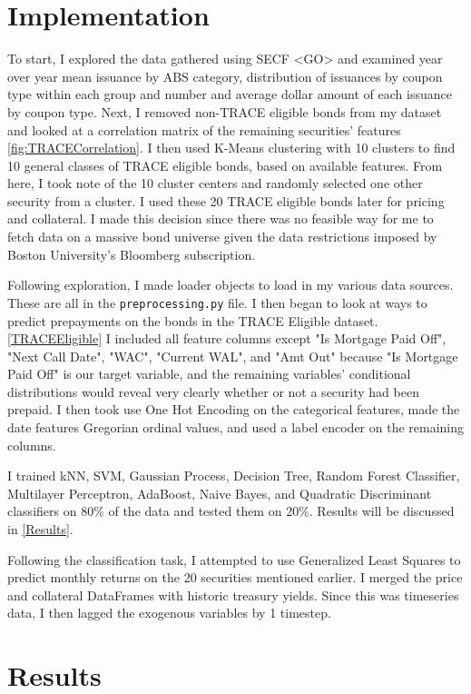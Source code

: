 \documentclass{article}
\begin{document}
\section*{Implementation}
To start, I explored the data gathered using SECF <GO> and examined year over year mean issuance by ABS category, distribution of issuances by coupon type within each group and number and average dollar amount of each issuance by coupon type. Next, I removed non-TRACE eligible bonds from my dataset and looked at a correlation matrix of the remaining securities' features \ref{fig:TRACECorrelation}. I then used K-Means clustering with 10 clusters to find 10 general classes of TRACE eligible bonds, based on available features. From here, I took note of the 10 cluster centers and randomly selected one other security from a cluster. I used these 20 TRACE eligible bonds later for pricing and collateral. I made this decision since there was no feasible way for me to fetch data on a massive bond universe given the data restrictions imposed by Boston University's Bloomberg subscription. 

Following exploration, I made loader objects to load in my various data sources. These are all in the \texttt{preprocessing.py} file. I then began to look at ways to predict prepayments on the bonds in the TRACE Eligible dataset. \ref{TRACEEligible} I included all feature columns except "Is Mortgage Paid Off", "Next Call Date", "WAC", "Current WAL", and "Amt Out" because "Is Mortgage Paid Off" is our target variable, and the remaining variables' conditional distributions would reveal very clearly whether or not a security had been prepaid. I then took use One Hot Encoding on the categorical features, made the date features Gregorian ordinal values, and used a label encoder on the remaining columns. 

I trained kNN, SVM, Gaussian Process, Decision Tree, Random Forest Classifier, Multilayer Perceptron, AdaBoost, Naive Bayes, and Quadratic Discriminant classifiers on 80\% of the data and tested them on 20\%. Results will be discussed in \ref{Results}. 

Following the classification task, I attempted to use Generalized Least Squares to predict monthly returns on the 20 securities mentioned earlier. I merged the price and collateral DataFrames with historic treasury yields. Since this was timeseries data, I then lagged the exogenous variables by 1 timestep. 


\section*{Results} 
\label{Results}
\end{document}
